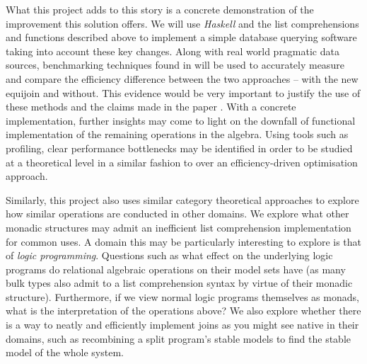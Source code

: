 What this project adds to this story is a concrete demonstration of the improvement this solution offers.
We will use \emph{Haskell} and the list comprehensions and functions described above to implement a simple database querying software taking into account these key changes. Along with real world pragmatic data sources, benchmarking techniques found in  will be used to accurately measure and compare the efficiency difference between the two approaches -- with the new equijoin and without. This evidence would be very important to justify the use of these methods and the claims made in the paper \cite{RelationalAlgebraByWayOfAdjunctions}.
With a concrete implementation, further insights may come to light on the downfall of functional implementation of the remaining operations in the algebra. Using tools such as profiling, clear performance bottlenecks may be identified in order to be studied at a theoretical level in a similar fashion to \cite{RelationalAlgebraByWayOfAdjunctions} over an efficiency-driven optimisation approach.

Similarly, this project also uses similar category theoretical approaches to explore how similar operations are conducted in other domains. We explore what other monadic structures may admit an inefficient list comprehension implementation for common uses. A domain this may be particularly interesting to explore is that of \emph{logic programming}. Questions such as what effect on the underlying logic programs do relational algebraic operations on their model sets have (as many bulk types also admit to a list comprehension syntax by virtue of their monadic structure). Furthermore, if we view normal logic programs themselves as monads, what is the interpretation of the operations above? We also explore whether there is a way to neatly and efficiently implement joins as you might see native in their domains, such as recombining a split program's stable models to find the stable model of the whole system.
